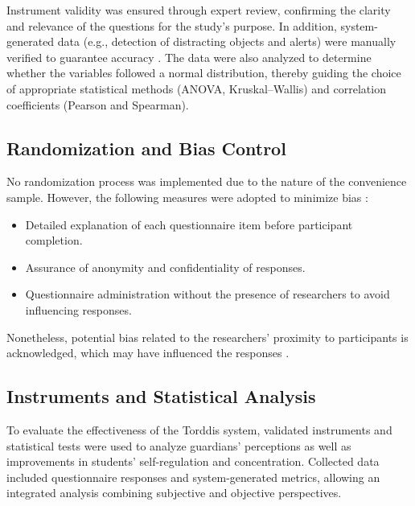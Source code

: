                 Instrument validity was ensured through expert review, confirming the clarity and relevance of the questions for the study’s purpose. In addition, system-generated data (e.g., detection of distracting objects and alerts) were manually verified to guarantee accuracy \citep{Wang2025Development}. The data were also analyzed to determine whether the variables followed a normal distribution, thereby guiding the choice of appropriate statistical methods (ANOVA, Kruskal–Wallis) and correlation coefficients (Pearson and Spearman).
                
                \subsection{Randomization and Bias Control}
                No randomization process was implemented due to the nature of the convenience sample. However, the following measures were adopted to minimize bias \citep{Huang2025How}:
                
                \begin{itemize}
                    \item Detailed explanation of each questionnaire item before participant completion.
                    
                    \item Assurance of anonymity and confidentiality of responses.
                    
                    \item Questionnaire administration without the presence of researchers to avoid influencing responses.
                \end{itemize}
                
                Nonetheless, potential bias related to the researchers’ proximity to participants is acknowledged, which may have influenced the responses \citep{DiPietro2025Meta}.
                
                \subsection{Instruments and Statistical Analysis}
                To evaluate the effectiveness of the Torddis system, validated instruments and statistical tests were used to analyze guardians’ perceptions as well as improvements in students’ self-regulation and concentration. Collected data included questionnaire responses and system-generated metrics, allowing an integrated analysis combining subjective and objective perspectives.
                
